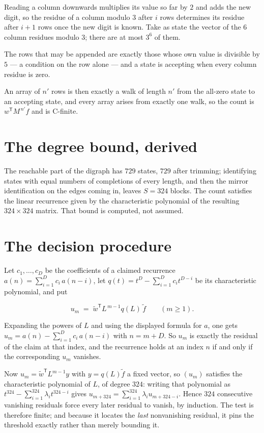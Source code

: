 \documentclass[11pt]{article}
\theoremstyle{definition}
\begin{document}
Reading a column downwards multiplies its value so far by $2$ and adds the new digit, so the residue of a column modulo $3$ after $i$ rows determines its residue after $i+1$ rows once the new digit is known. Take as state the vector of the $6$ column residues modulo $3$; there are at most $3^{6}$ of them.

The rows that may be appended are exactly those whose own value is divisible by $5$ --- a condition on the row alone --- and a state is accepting when every column residue is zero.

An array of $n'$ rows is then exactly a walk of length $n'$ from the all-zero state to an accepting state, and every array arises from exactly one walk, so the count is $w^{\mathsf T}M^{\,n'}f$ and is C-finite.

\section{The degree bound, derived}

The reachable part of the digraph has $729$ states, $729$ after trimming; identifying states with equal numbers of completions of every length, and then the mirror identification on the edges coming in, leaves $S = 324$ blocks. The count satisfies the linear recurrence given by the characteristic polynomial of the resulting $324\times324$ matrix. That bound is computed, not assumed.

\section{The decision procedure}

Let $c_1,\dots,c_D$ be the coefficients of a claimed recurrence $a(n) = \sum_{i=1}^{D} c_i\,a(n-i)$, let $q(t) = t^{D} - \sum_{i=1}^{D} c_i t^{D-i}$ be its characteristic polynomial, and put

\[u_m \;=\; \tilde w^{\mathsf T} L^{\,m-1} q(L)\,\tilde f \qquad (m \ge 1).\]

Expanding the powers of $L$ and using the displayed formula for $a$, one gets $u_m = a(n) - \sum_{i=1}^{D} c_i\,a(n-i)$ with $n = m + D$. So $u_m$ is exactly the residual of the claim at that index, and the recurrence holds at an index $n$ if and only if the corresponding $u_m$ vanishes.

Now $u_m = \tilde w^{\mathsf T} L^{m-1} y$ with $y = q(L)\tilde f$ a fixed vector, so $(u_m)$ satisfies the characteristic polynomial of $L$, of degree $324$: writing that polynomial as $t^{324} - \sum_{i=1}^{324} \lambda_i t^{324-i}$ gives $u_{m+324} = \sum_{i=1}^{324} \lambda_i u_{m+324-i}$. Hence $324$ consecutive vanishing residuals force every later residual to vanish, by induction. The test is therefore finite; and because it locates the {\itshape last} nonvanishing residual, it pins the threshold exactly rather than merely bounding it.
\end{document}
